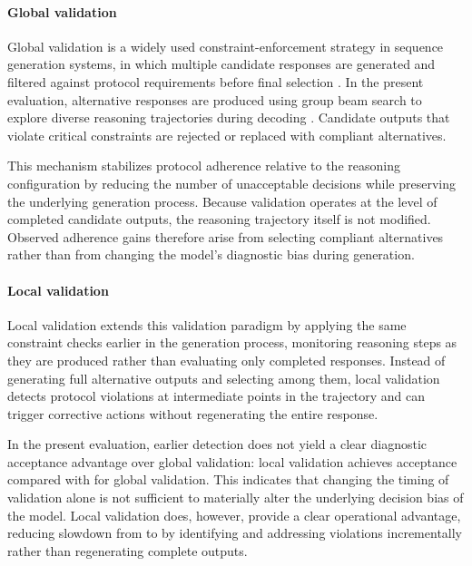 \documentclass[twocolumn]{article}
\begin{document}
\paragraph{Global validation}

Global validation is a widely used constraint-enforcement strategy in sequence
generation systems, in which multiple candidate responses are generated and
filtered against protocol requirements before final selection
\parencite{hokamp2017constrained,zhang2023constrained,koo2024automata}. In the
present evaluation, alternative responses are produced using group beam search
to explore diverse reasoning trajectories during decoding
\parencite{vijayakumar2016diverse}. Candidate outputs that violate critical
constraints are rejected or replaced with compliant alternatives.

This mechanism stabilizes protocol adherence relative to the reasoning
configuration by reducing the number of unacceptable decisions while preserving
the underlying generation process. Because validation operates at the level of
completed candidate outputs, the reasoning trajectory itself is not modified.
Observed adherence gains therefore arise from selecting compliant alternatives
rather than from changing the model's diagnostic bias during generation.

\paragraph{Local validation}

Local validation extends this validation paradigm by applying the same
constraint checks earlier in the generation process, monitoring reasoning steps
as they are produced rather than evaluating only completed responses. Instead of
generating full alternative outputs and selecting among them, local validation
detects protocol violations at intermediate points in the trajectory and can
trigger corrective actions without regenerating the entire response.

In the present evaluation, earlier detection does not yield a clear diagnostic
acceptance advantage over global validation: local validation achieves
\SSNHLLocalValidationAcceptedPct{} acceptance compared with
\SSNHLGlobalValidationAcceptedPct{} for global validation. This indicates that
changing the timing of validation alone is not sufficient to materially alter
the underlying decision bias of the model. Local validation does, however,
provide a clear operational advantage, reducing slowdown from
\SSNHLGlobalValidationSlowdownX{} to \SSNHLLocalValidationSlowdownX{} by
identifying and addressing violations incrementally rather than regenerating
complete outputs.
\end{document}
